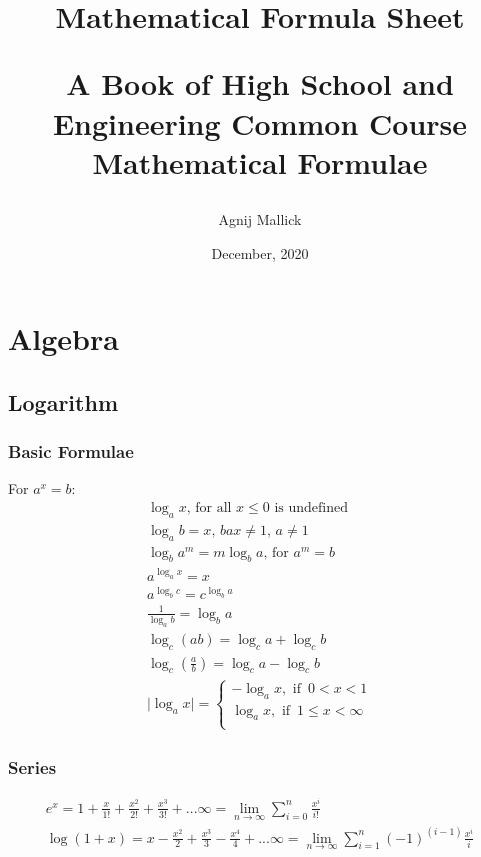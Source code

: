 \documentclass[openany, oneside]{book}
\title{Mathematical Formula Sheet\\\begin{large}
A Book of High School and Engineering Common Course Mathematical Formulae
\end{large}}
\date{December, 2020}
\author{Agnij Mallick}
\begin{document}

\maketitle
{}
\tableofcontents
\newpage

\part{Algebra}
\large{\chapter{Logarithm}}
\section{Basic Formulae}
For $a^x=b$:
\begin{align}
\log_a x\text{, for all }x\leq0\text{ is undefined}\\
\log_a b=x\text{, }bax\neq1\text{, }a\neq1\\
\log_b a^m=m\log_b a\text{, for } a^m=b\\
a^{\log_a x}=x\\
a^{\log_b c}=c^{\log_b a}\\
\frac{1}{\log_a b}=\log_b a\\
\log_c (ab)=\log_c a+\log_c b\\
\log_c (\frac{a}{b})=\log_c a-\log_c b\\
\lvert \log_a x \rvert=\begin{cases}
-\log_a x, \text{ if } \, 0 < x < 1\\
\log_a x, \text{ if } \, 1\leq x < \infty \\
\end{cases}
\end{align}

\section{Series}
\begin{align}
e^x=1+\frac{x}{1!}+\frac{x^2}{2!}+\frac{x^3}{3!}+...\infty=\lim_{n\to\infty}\sum_{i=0}^{n}\frac{x^i}{i!}\\
\log(1+x)=x-\frac{x^2}{2}+\frac{x^3}{3}-\frac{x^4}{4}+...\infty=\lim_{n\to\infty}\sum_{i=1}^{n}(-1)^{(i-1)}\frac{x^i}{i}
\end{align}
\end{document}
